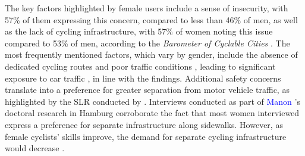 \begin{refsegment}
The key factors highlighted by female users include a sense of insecurity, with 57\% of them expressing this concern, compared to less than 46\% of men, as well as the lack of cycling infrastructure, with 57\% of women noting this issue compared to 53\% of men, according to the \textsl{Barometer of Cyclable Cities} \textcolor{blue}{\autocite[26]{vermeulen_barometre_2022}}. The most frequently mentioned factors, which vary by gender, include the absence of dedicated cycling routes and poor traffic conditions \textcolor{blue}{\autocite[61]{dyck_perceived_2013}}, leading to significant exposure to car traffic \textcolor{blue}{\autocites[36]{krizek_gender_2005}[9]{mitra_can_2019}}, in line with the findings. Additional safety concerns translate into a preference for greater separation from motor vehicle traffic, as highlighted by the \acrshort{SLR} conducted by \textcolor{blue}{\textcite[35, 49]{aldred_cycling_2017}}. Interviews conducted as part of \textcolor{blue}{Manon} \textcolor{blue}{\textcite[261]{eskenazi_voir_2022}}'s doctoral research in Hamburg corroborate the fact that most women interviewed express a preference for separate infrastructure along sidewalks. However, as female cyclists' skills improve, the demand for separate cycling infrastructure would decrease \textcolor{blue}{\autocite[261]{eskenazi_voir_2022}}.%


\end{refsegment}

